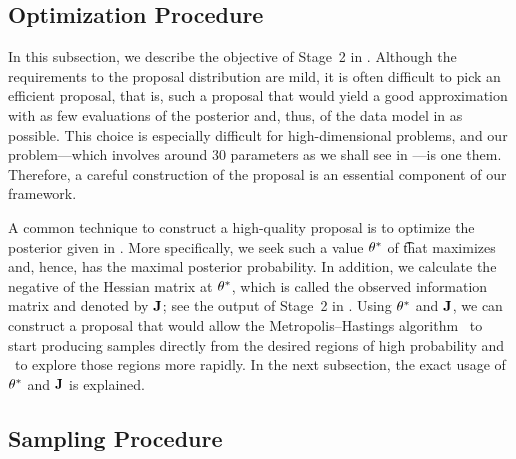 \subsection{Optimization Procedure}

In this subsection, we describe the objective of Stage~2 in
. Although the requirements to the proposal
distribution are mild, it is often difficult to pick an efficient proposal, that
is, such a proposal that would yield a good approximation with as few
evaluations of the posterior and, thus, of the data model in
 as possible. This choice is especially difficult for
high-dimensional problems, and our problem---which involves around 30 parameters
as we shall see in ---is one them. Therefore, a careful
construction of the proposal is an essential component of our framework.

A common technique to construct a high-quality proposal is to optimize the
posterior given in . More specifically, we seek such a
value $\theta^*$ of \t that maximizes  and, hence, has the
maximal posterior probability. In addition, we calculate the negative of the
Hessian matrix at $\theta^*$, which is called the observed information matrix and
denoted by $\mathbf{J}$; see the output of Stage~2 in .
Using $\theta^*$ and $\mathbf{J}$, we can construct a proposal that would allow the
Metropolis--Hastings algorithm \one~to start producing samples directly from the
desired regions of high probability and \two~to explore those regions more
rapidly. In the next subsection, the exact usage of $\theta^*$ and $\mathbf{J}$ is
explained.

\subsection{Sampling Procedure}

